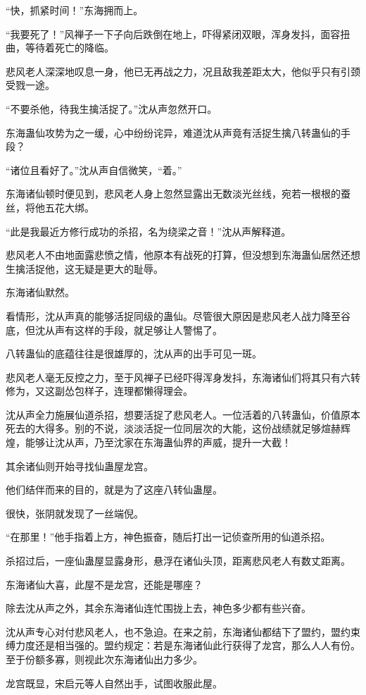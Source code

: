 \begin{this_body}
“快，抓紧时间！”东海拥而上。

“我要死了！”风禅子一下子向后跌倒在地上，吓得紧闭双眼，浑身发抖，面容扭曲，等待着死亡的降临。

悲风老人深深地叹息一身，他已无再战之力，况且敌我差距太大，他似乎只有引颈受戮一途。

“不要杀他，待我生擒活捉了。”沈从声忽然开口。

东海蛊仙攻势为之一缓，心中纷纷诧异，难道沈从声竟有活捉生擒八转蛊仙的手段？

“诸位且看好了。”沈从声自信微笑，“着。”

东海诸仙顿时便见到，悲风老人身上忽然显露出无数淡光丝线，宛若一根根的蚕丝，将他五花大绑。

“此是我最近方修行成功的杀招，名为绕梁之音！”沈从声解释道。

悲风老人不由地面露悲愤之情，他原本有战死的打算，但没想到东海蛊仙居然还想生擒活捉他，这无疑是更大的耻辱。

东海诸仙默然。

看情形，沈从声真的能够活捉同级的蛊仙。尽管很大原因是悲风老人战力降至谷底，但沈从声有这样的手段，就足够让人警惕了。

八转蛊仙的底蕴往往是很雄厚的，沈从声的出手可见一斑。

悲风老人毫无反控之力，至于风禅子已经吓得浑身发抖，东海诸仙们将其只有六转修为，又这副怂包样子，连理都懒得理会。

沈从声全力施展仙道杀招，想要活捉了悲风老人。一位活着的八转蛊仙，价值原本死去的大得多。别的不说，淡淡活捉一位同层次的大能，这份战绩就足够煊赫辉煌，能够让沈从声，乃至沈家在东海蛊仙界的声威，提升一大截！

其余诸仙则开始寻找仙蛊屋龙宫。

他们结伴而来的目的，就是为了这座八转仙蛊屋。

很快，张阴就发现了一丝端倪。

“在那里！”他手指着上方，神色振奋，随后打出一记侦查所用的仙道杀招。

杀招过后，一座仙蛊屋显露身形，悬浮在诸仙头顶，距离悲风老人有数丈距离。

东海诸仙大喜，此屋不是龙宫，还能是哪座？

除去沈从声之外，其余东海诸仙连忙围拢上去，神色多少都有些兴奋。

沈从声专心对付悲风老人，也不急迫。在来之前，东海诸仙都结下了盟约，盟约束缚力度还是相当强的。盟约规定：若是东海诸仙此行获得了龙宫，那么人人有份。至于份额多寡，则视此次东海诸仙出力多少。

龙宫既显，宋启元等人自然出手，试图收服此屋。


\end{this_body}
